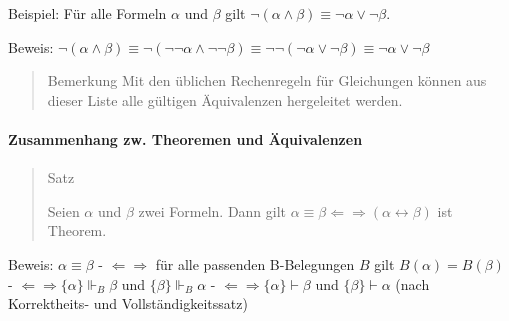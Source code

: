 \documentclass[a4paper]{article}
\begin{document}
\begin{multicols}{3}
  Beispiel: Für alle Formeln $\alpha$ und $\beta$ gilt
  $\lnot(\alpha\wedge\beta)\equiv\lnot\alpha\vee\lnot\beta$.

  Beweis:
  $\lnot(\alpha\wedge\beta) \equiv \lnot(\lnot\lnot\alpha\wedge\lnot\lnot\beta) \equiv \lnot\lnot(\lnot\alpha\vee\lnot\beta) \equiv \lnot\alpha\vee\lnot\beta$

  \begin{quote}
    Bemerkung Mit den üblichen Rechenregeln für Gleichungen können aus
    dieser Liste alle gültigen Äquivalenzen hergeleitet werden.
  \end{quote}

  \paragraph{Zusammenhang zw. Theoremen und
    Äquivalenzen}\label{zusammenhang-zw.-theoremen-und-uxe4quivalenzen}

  \begin{quote}
    Satz

    Seien $\alpha$ und $\beta$ zwei Formeln. Dann gilt
    $\alpha\equiv\beta\Leftarrow\Rightarrow(\alpha\leftrightarrow\beta)$ ist
    Theorem.
  \end{quote}

  Beweis: $\alpha\equiv\beta$ - $\Leftarrow\Rightarrow$ für alle passenden
  B-Belegungen $B$ gilt $B(\alpha)=B(\beta)$ -
  $\Leftarrow\Rightarrow \{\alpha\}\Vdash_B\beta$ und
  $\{\beta\}\Vdash_B \alpha$ -
  $\Leftarrow\Rightarrow \{\alpha\}\vdash\beta$ und
  $\{\beta\}\vdash\alpha$ (nach Korrektheits- und Vollständigkeitssatz)


\end{multicols}
\end{document}
